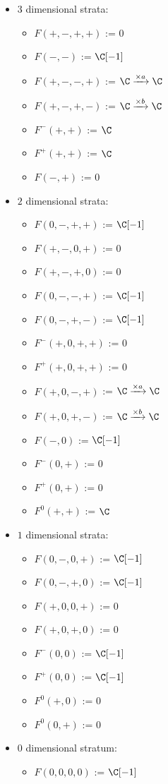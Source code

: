 \begin{itemize}
\item $3$ dimensional strata:
\begin{itemize}
\item $F(+,-,+,+)$ := $0$
\item $F(-,-)$ := $\C[-1]$
\item $F(+,-,-,+)$ := $\C \xrightarrow{\times a} \C $
\item $F(+,-,+,-)$ := $\C \xrightarrow{\times b} \C $
\item $F^-(+,+)$ := $\C$
\item $F^+(+,+)$ := $\C$
\item $F(-,+)$ := $0$
\end{itemize}

\item $2$ dimensional strata:
\begin{itemize}
\item $F(0,-,+,+)$ := $\C[-1]$
\item $F(+,-,0,+)$ := $0$
\item $F(+,-,+,0)$ := $0$
\item $F(0,-,-,+)$ := $\C[-1]$
\item $F(0,-,+,-)$ := $\C[-1]$
\item $F^-(+,0,+,+)$ := $0$
\item $F^+(+,0,+,+)$ := $0$
\item $F(+,0,-,+)$ := $\C \xrightarrow{\times a} \C $
\item $F(+,0,+,-)$ := $\C \xrightarrow{\times b} \C $
\item $F(-,0)$ := $\C[-1]$
\item $F^-(0,+)$ := $0$
\item $F^+(0,+)$ := $0$
\item $F^0(+,+)$ := $\C$
\end{itemize}

\item $1$ dimensional strata:
\begin{itemize}
\item $F(0,-,0,+)$ := $\C[-1]$
\item $F(0,-,+,0)$ := $\C[-1]$
\item $F(+,0,0,+)$ := $0$
\item $F(+,0,+,0)$ := $0$
\item $F^-(0,0)$ := $\C[-1]$
\item $F^+(0,0)$ := $\C[-1]$
\item $F^0(+,0)$ := $0$
\item $F^0(0,+)$ := $0$
\end{itemize}

\item $0$ dimensional stratum:
\begin{itemize}
\item $F(0,0,0,0)$ := $\C[-1]$
\end{itemize}
\end{itemize}
